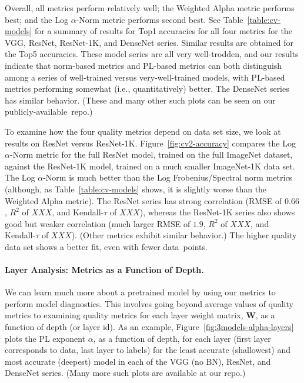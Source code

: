 Overall, all metrics perform relatively well; the Weighted Alpha metric performs best; and the Log $\alpha$-Norm metric performs second best.
See Table~\ref{table:cv-models} for a summary of results for Top1 accuracies for all four metrics for the VGG, ResNet, ResNet-1K, and DenseNet series.
Similar results are obtained for the Top5 accuracies.
These model series are all very well-trodden, and our results indicate that norm-based metrics and PL-based metrics can both distinguish among a series of well-trained versus very-well-trained models, with PL-based metrics performing somewhat (i.e., quantitatively) better.
The DenseNet series has similar behavior.
(These and many other such plots can be seen on our publicly-available~repo.)


To examine how the four quality metrics depend on data set size, we look at results on ResNet versus ResNet-1K.
Figure~\ref{fig:cv2-accuracy} compares the Log $\alpha$-Norm metric for the full ResNet model, trained on the full ImageNet dataset, against the ResNet-1K model, trained on a much smaller ImageNet-1K data set.
The Log $\alpha$-Norm is much better than the Log Frobenius/Spectral norm metrics (although, as Table~\ref{table:cv-models} shows, it is slightly worse than the Weighted Alpha metric).
The ResNet series has strong correlation (RMSE of $0.66$, $R^2$ of $XXX$, and Kendall-$\tau$ of $XXX$), whereas the ResNet-1K series also shows good but weaker correlation (much larger RMSE of $1.9$, $R^2$ of $XXX$, and Kendall-$\tau$ of $XXX$).
(Other metrics exhibit similar behavior.)
The higher quality data set shows a better fit, even with fewer data~points.


\paragraph{Layer Analysis: Metrics as a Function of Depth.}

We can learn much more about a pretrained model by using our metrics to perform model diagnostics.
This involves going beyond average values of quality metrics to examining quality metrics for each layer weight matrix, $\mathbf{W}$, as a function of depth (or layer id).  
As an example,
Figure~\ref{fig:3models-alpha-layers} plots the PL exponent $\alpha$, as a function of depth, for each layer (first layer corresponds to data, last layer to labels) for the least accurate (shallowest) and most accurate (deepest) model in each of the VGG (no BN), ResNet, and DenseNet series.
(Many more such plots are available at our repo.)


